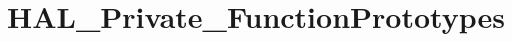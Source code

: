 \hypertarget{group___h_a_l___private___function_prototypes}{}\section{H\+A\+L\+\_\+\+Private\+\_\+\+Function\+Prototypes}
\label{group___h_a_l___private___function_prototypes}
